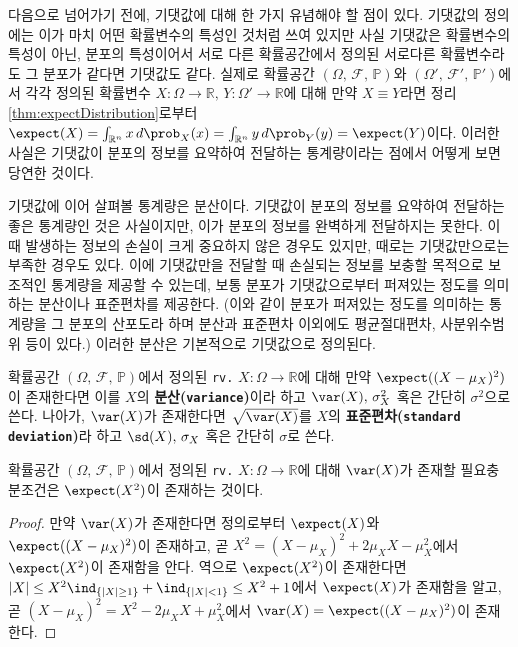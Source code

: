 다음으로 넘어가기 전에, 기댓값에 대해 한 가지 유념해야 할 점이 있다. 기댓값의 정의에는 이가 마치 어떤 확률변수의 특성인 것처럼 쓰여 있지만 사실 기댓값은 확률변수의 특성이 아닌, 분포의 특성이어서 서로 다른 확률공간에서 정의된 서로다른 확률변수라도 그 분포가 같다면 기댓값도 같다. 실제로 확률공간 $(\Omega,\,\mathcal{F},\,\mathbb{P})$와 $(\Omega',\,\mathcal{F}',\,\mathbb{P}')$에서 각각 정의된 확률변수 $X:\Omega\to\mathbb{R},\,Y:\Omega'\to\mathbb{R}$에 대해 만약 $X\equiv Y$라면 정리 \ref{thm:expectDistribution}로부터 $\expect(X)=\int_{\mathbb{R}^n}x\,d\prob_X(x)=\int_{\mathbb{R}^n}y\,d\prob_Y(y)=\expect(Y)$이다. 이러한 사실은 기댓값이 분포의 정보를 요약하여 전달하는 통계량이라는 점에서 어떻게 보면 당연한 것이다.

기댓값에 이어 살펴볼 통계량은 분산이다. 기댓값이 분포의 정보를 요약하여 전달하는 좋은 통계량인 것은 사실이지만, 이가 분포의 정보를 완벽하게 전달하지는 못한다. 이때 발생하는 정보의 손실이 크게 중요하지 않은 경우도 있지만, 때로는 기댓값만으로는 부족한 경우도 있다. 이에 기댓값만을 전달할 때 손실되는 정보를 보충할 목적으로 보조적인 통계량을 제공할 수 있는데, 보통 분포가 기댓값으로부터 퍼져있는 정도를 의미하는 분산이나 표준편차를 제공한다. (이와 같이 분포가 퍼져있는 정도를 의미하는 통계량을 그 분포의 산포도라 하며 분산과 표준편차 이외에도 평균절대편차, 사분위수범위 등이 있다.) 이러한 분산은 기본적으로 기댓값으로 정의된다.

\begin{definition}
    확률공간 $(\Omega,\,\mathcal{F},\,\mathbb{P})$에서 정의된 \texttt{rv.} $X:\Omega\to\mathbb{R}$에 대해 만약 $\expect((X-\mu_X)^2)$이 존재한다면 이를 $X$의 \textbf{분산(\texttt{variance})}이라 하고 $\var(X),\,\sigma_X^2$ 혹은 간단히 $\sigma^2$으로 쓴다. 나아가, $\var(X)$가 존재한다면 $\sqrt{\var(X)}$를 $X$의 \textbf{표준편차(\texttt{standard deviation})}라 하고 $\sd(X),\,\sigma_X$ 혹은 간단히 $\sigma$로 쓴다.
\end{definition}

\begin{proposition}
    확률공간 $(\Omega,\,\mathcal{F},\,\mathbb{P})$에서 정의된 \texttt{rv.} $X:\Omega\to\mathbb{R}$에 대해 $\var(X)$가 존재할 필요충분조건은 $\expect(X^2)$이 존재하는 것이다.
\end{proposition}

\begin{proof}
    만약 $\var(X)$가 존재한다면 정의로부터 $\expect(X)$와 $\expect((X-\mu_X)^2)$이 존재하고, 곧 $X^2=(X-\mu_X)^2+2\mu_XX-\mu_X^2$에서 $\expect(X^2)$이 존재함을 안다. 역으로 $\expect(X^2)$이 존재한다면 $|X|\leq X^2\ind_{\{|X|\geq1\}}+\ind_{\{|X|<1\}}\leq X^2+1$에서 $\expect(X)$가 존재함을 알고,곧 $(X-\mu_X)^2=X^2-2\mu_XX+\mu_X^2$에서 $\var(X)=\expect((X-\mu_X)^2)$이 존재한다.
\end{proof}

